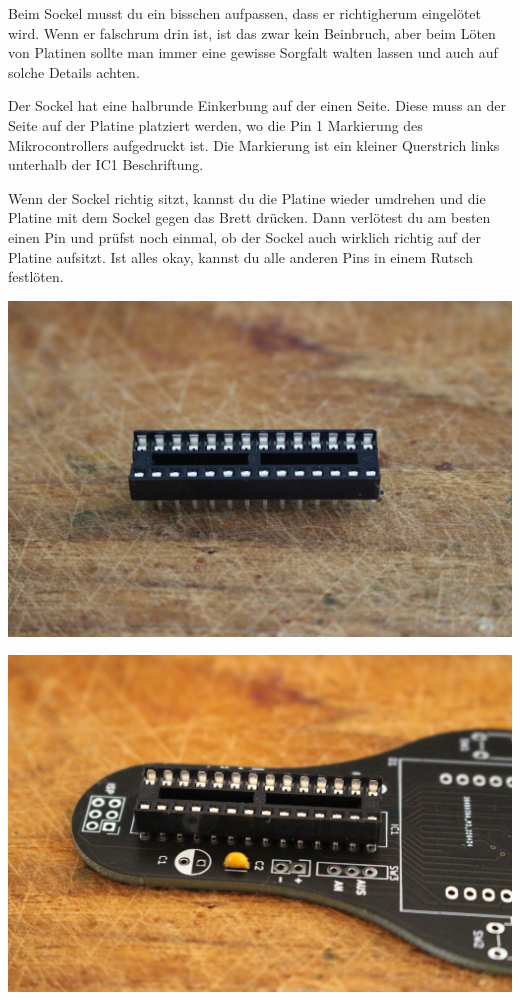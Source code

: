 \documentclass{article}
\begin{document}
Beim Sockel musst du ein bisschen aufpassen, dass er richtigherum eingelötet wird. Wenn er falschrum drin ist, ist das zwar kein Beinbruch, aber beim Löten von Platinen sollte man immer eine gewisse Sorgfalt walten lassen und auch auf solche Details achten.

Der Sockel hat eine halbrunde Einkerbung auf der einen Seite. Diese muss an der Seite auf der Platine platziert werden, wo die Pin 1 Markierung des Mikrocontrollers aufgedruckt ist. Die Markierung ist ein kleiner Querstrich links unterhalb der IC1 Beschriftung.

Wenn der Sockel richtig sitzt, kannst du die Platine wieder umdrehen und die Platine mit dem Sockel gegen das Brett drücken. Dann verlötest du am besten einen Pin und prüfst noch einmal, ob der Sockel auch wirklich richtig auf der Platine aufsitzt. Ist alles okay, kannst du alle anderen Pins in einem Rutsch festlöten.

\vspace{1cm}

\begin{minipage}[b]{0.5\textwidth}
	\includegraphics[width=\textwidth]{Bilder2022/IMG_8196.JPG}
\end{minipage}
\begin{minipage}[b]{0.5\textwidth}
	\includegraphics[width=\textwidth]{Bilder2022/IMG_8197.JPG}
\end{minipage}
\end{document}
